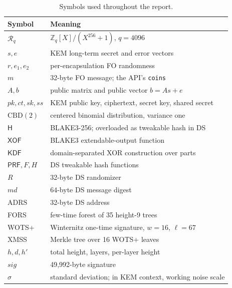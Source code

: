 \documentclass[runningheads]{llncs}
\newcommand{\Z}{\mathbb{Z}}
\newcommand{\Ring}{\mathcal{R}_q}
\newcommand{\Hash}{\mathsf{H}}
\newcommand{\XOF}{\mathsf{XOF}}
\newcommand{\KDF}{\mathsf{KDF}}
\newcommand{\PRF}{\mathsf{PRF}}
\newcommand{\ADRS}{\mathrm{ADRS}}
\newcommand{\CBD}{\mathrm{CBD}}
\begin{document}
\begin{longtable}{@{}ll@{}}
\caption{Symbols used throughout the report.}\\
\toprule
Symbol & Meaning \\
\midrule
\endhead
$\Ring$ & $\Z_q[X]/(X^{256}+1)$, $q=4096$ \\
$s,e$ & KEM long-term secret and error vectors \\
$r,e_1,e_2$ & per-encapsulation FO randomness \\
$m$ & 32-byte FO message; the API's \texttt{coins} \\
$A,b$ & public matrix and public vector $b=As+e$ \\
$pk,ct,sk,ss$ & KEM public key, ciphertext, secret key, shared secret \\
$\CBD(2)$ & centered binomial distribution, variance one \\
$\Hash$ & BLAKE3-256; overloaded as tweakable hash in DS \\
$\XOF$ & BLAKE3 extendable-output function \\
$\KDF$ & domain-separated XOR construction over parts \\
$\PRF,F,H$ & DS tweakable hash functions \\
$R$ & 32-byte DS randomizer \\
$md$ & 64-byte DS message digest \\
$\ADRS$ & 32-byte DS address \\
FORS & few-time forest of 35 height-9 trees \\
WOTS+ & Winternitz one-time signature, $w=16$, $\ell=67$ \\
XMSS & Merkle tree over 16 WOTS+ leaves \\
$h,d,h'$ & total height, layers, per-layer height \\
$sig$ & 49,992-byte signature \\
$\sigma$ & standard deviation; in KEM context, working noise scale \\
\bottomrule
\end{longtable}
\end{document}
